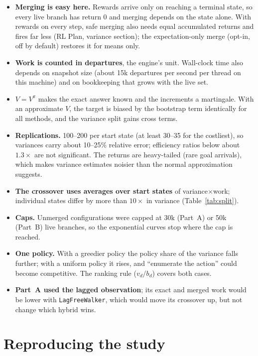 \documentclass[11pt]{article}
\newcommand{\code}[1]{\texttt{#1}}
\begin{document}
\begin{itemize}
\item \textbf{Merging is easy here.} Rewards arrive only on reaching a terminal state, so every live branch has return 0
  and merging depends on the state alone. With rewards on every step, safe merging also needs equal accumulated returns
  and fires far less (RL Plan, variance section); the expectation-only merge (opt-in, off by default) restores it for
  means only.
\item \textbf{Work is counted in departures}, the engine's unit. Wall-clock time also depends on snapshot size (about
  15k departures per second per thread on this machine) and on bookkeeping that grows with the live set.
\item \textbf{$V=V^\pi$} makes the exact answer known and the increments a martingale. With an approximate $V$, the
  target is biased by the bootstrap term identically for all methods, and the variance split gains cross terms.
\item \textbf{Replications.} 100--200 per start state (at least 30--35 for the costliest), so variances carry about
  10--25\% relative error; efficiency ratios below about $1.3\times$ are not significant. The returns are heavy-tailed
  (rare goal arrivals), which makes variance estimates noisier than the normal approximation suggests.
\item \textbf{The crossover uses averages over start states} of variance$\times$work; individual states differ by more than
  $10\times$ in variance (Table~\ref{tab:split}).
\item \textbf{Caps.} Unmerged configurations were capped at 30k (Part~A) or 50k (Part~B) live branches, so the
  exponential curves stop where the cap is reached.
\item \textbf{One policy.} With a greedier policy the policy share of the variance falls further; with a uniform policy it
  rises, and ``enumerate the action'' could become competitive. The ranking rule ($v_d/b_d$) covers both cases.
\item \textbf{Part~A used the lagged observation}; its exact and merged work would be lower with \code{LagFreeWalker}, which
  would move its crossover up, but not change which hybrid wins.
\end{itemize}

\section{Reproducing the study}\label{sec:repro}
\end{document}
